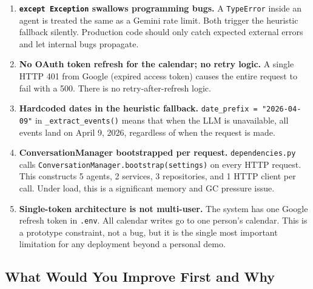 \documentclass[12pt, a4paper]{article}
\begin{document}
\begin{dangerbox}
\begin{enumerate}
  \item \textbf{\texttt{except Exception} swallows programming bugs.} A \texttt{TypeError} inside an agent is treated the same as a Gemini rate limit. Both trigger the heuristic fallback silently. Production code should only catch expected external errors and let internal bugs propagate.

  \item \textbf{No OAuth token refresh for the calendar; no retry logic.} A single HTTP 401 from Google (expired access token) causes the entire request to fail with a 500. There is no retry-after-refresh logic.

  \item \textbf{Hardcoded dates in the heuristic fallback.} \texttt{date\_prefix = "2026-04-09"} in \texttt{\_extract\_events()} means that when the LLM is unavailable, all events land on April 9, 2026, regardless of when the request is made.

  \item \textbf{ConversationManager bootstrapped per request.} \texttt{dependencies.py} calls \texttt{ConversationManager.bootstrap(settings)} on every HTTP request. This constructs 5 agents, 2 services, 3 repositories, and 1 HTTP client per call. Under load, this is a significant memory and GC pressure issue.

  \item \textbf{Single-token architecture is not multi-user.} The system has one Google refresh token in \texttt{.env}. All calendar writes go to one person's calendar. This is a prototype constraint, not a bug, but it is the single most important limitation for any deployment beyond a personal demo.
\end{enumerate}
\end{dangerbox}

\subsection{What Would You Improve First and Why}
\end{document}
